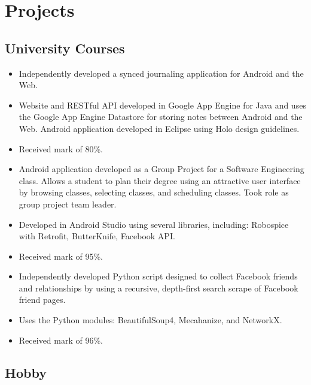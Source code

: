 \documentclass[11pt,letterpaper,sans]{moderncv}        %
\begin{document}
\section{Projects}
\subsection{University Courses}
{
  \begin{itemize}
    \item Independently developed a synced journaling application for Android and the Web.
    \item Website and RESTful API developed in Google App Engine for Java and uses the Google App Engine Datastore for storing notes between Android and the Web. Android application developed in Eclipse using Holo design guidelines.
    \item Received mark of 80\%.
  \end{itemize}
}

{
  \begin{itemize}
    \item Android application developed as a Group Project for a Software Engineering class. Allows a student to plan their degree using an attractive user interface by browsing classes, selecting classes, and scheduling classes. Took role as group project team leader.
    \item Developed in Android Studio using several libraries, including: Robospice with Retrofit, ButterKnife, Facebook API.
    \item Received mark of 95\%.
  \end{itemize}
}

{
  \begin{itemize}
    \item Independently developed Python script designed to collect Facebook friends and relationships by using a recursive, depth-first search scrape of Facebook friend pages.
    \item Uses the Python modules: BeautifulSoup4, Mecahanize, and NetworkX.
    \item Received mark of 96\%.
  \end{itemize}
}


\vspace*{-0.5cm} %
\subsection{Hobby}
\end{document}
